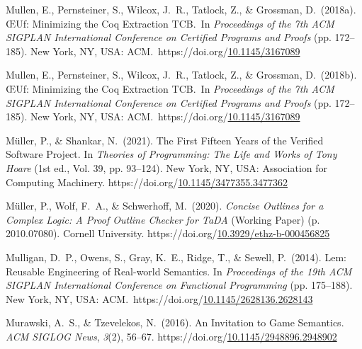 \documentclass[12pt,twoside]{article}
\begin{document}
{\begin{thebibliography}{1079}
\mdbibitemlabel{}Mullen, E., Pernsteiner, S., Wilcox, J.~R., Tatlock, Z., \& Grossman, D.~(2018a). ŒUf: Minimizing the Coq Extraction TCB.~In \emph{Proceedings of the 7th ACM SIGPLAN International Conference on Certified Programs and Proofs} (pp. 172–185). New York, NY, USA: ACM.~https://doi.org/\href{https://dx.doi.org/10.1145/3167089}{10.1145/3167089}%

\mdbibitemlabel{}Mullen, E., Pernsteiner, S., Wilcox, J.~R., Tatlock, Z., \& Grossman, D.~(2018b). ŒUf: Minimizing the Coq Extraction TCB.~In \emph{Proceedings of the 7th ACM SIGPLAN International Conference on Certified Programs and Proofs} (pp. 172–185). New York, NY, USA: ACM.~https://doi.org/\href{https://dx.doi.org/10.1145/3167089}{10.1145/3167089}%

\mdbibitemlabel{}Müller, P., \& Shankar, N.~(2021). The First Fifteen Years of the Verified Software Project. In \emph{Theories of Programming: The Life and Works of Tony Hoare} (1st ed., Vol. 39, pp. 93–124). New York, NY, USA: Association for Computing Machinery. https://doi.org/\href{https://dx.doi.org/10.1145/3477355.3477362}{10.1145/3477355.3477362}%

\mdbibitemlabel{}Müller, P., Wolf, F.~A., \& Schwerhoff, M.~(2020). \emph{Concise Outlines for a Complex Logic: A Proof Outline Checker for TaDA} (Working Paper) (p. 2010.07080). Cornell University. https://doi.org/\href{https://dx.doi.org/10.3929/ethz-b-000456825}{10.3929/ethz-b-000456825}%

\mdbibitemlabel{}Mulligan, D.~P., Owens, S., Gray, K.~E., Ridge, T., \& Sewell, P.~(2014). Lem: Reusable Engineering of Real-world Semantics. In \emph{Proceedings of the 19th ACM SIGPLAN International Conference on Functional Programming} (pp. 175–188). New York, NY, USA: ACM.~https://doi.org/\href{https://dx.doi.org/10.1145/2628136.2628143}{10.1145/2628136.2628143}%

\mdbibitemlabel{}Murawski, A.~S., \& Tzevelekos, N.~(2016). An Invitation to Game Semantics. \emph{ACM SIGLOG News}, \emph{3}(2), 56–67. https://doi.org/\href{https://dx.doi.org/10.1145/2948896.2948902}{10.1145/2948896.2948902}%


\end{thebibliography}}
\end{document}
